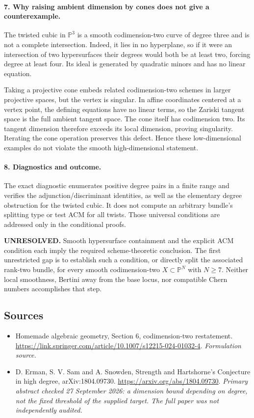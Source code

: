 \documentclass[11pt]{article}
\begin{document}
\paragraph{7. Why raising ambient dimension by cones does not give a counterexample.}
The twisted cubic in $\mathbb P^3$ is a smooth codimension-two curve of degree three and is not a complete intersection. Indeed, it lies in no hyperplane, so if it were an intersection of two hypersurfaces their degrees would both be at least two, forcing degree at least four. Its ideal is generated by quadratic minors and has no linear equation.

Taking a projective cone embeds related codimension-two schemes in larger projective spaces, but the vertex is singular. In affine coordinates centered at a vertex point, the defining equations have no linear terms, so the Zariski tangent space is the full ambient tangent space. The cone itself has codimension two. Its tangent dimension therefore exceeds its local dimension, proving singularity. Iterating the cone operation preserves this defect. Hence these low-dimensional examples do not violate the smooth high-dimensional statement.

\paragraph{8. Diagnostics and outcome.}
The exact diagnostic enumerates positive degree pairs in a finite range and verifies the adjunction/discriminant identities, as well as the elementary degree obstruction for the twisted cubic. It does not compute an arbitrary bundle's splitting type or test ACM for all twists. Those universal conditions are addressed only in the conditional proofs.

\textbf{UNRESOLVED.} Smooth hypersurface containment and the explicit ACM condition each imply the required scheme-theoretic conclusion. The first unrestricted gap is to establish such a condition, or directly split the associated rank-two bundle, for every smooth codimension-two $X\subset\mathbb P^N$ with $N\geq7$. Neither local smoothness, Bertini away from the base locus, nor compatible Chern numbers accomplishes that step.

\subsection{Sources}
\begin{itemize}
\item[S1]Homemade algebraic geometry, Section 6, codimension-two restatement.
\url{https://link.springer.com/article/10.1007/s12215-024-01032-4}.
\textit{Formulation source.}
\item[E1]D. Erman, S. V. Sam and A. Snowden, Strength and Hartshorne's Conjecture in high degree, arXiv:1804.09730.
\url{https://arxiv.org/abs/1804.09730}.
\textit{Primary abstract checked 27 September 2026: a dimension bound depending on degree, not the fixed threshold of the supplied target. The full paper was not independently audited.}
\end{itemize}
\end{document}
